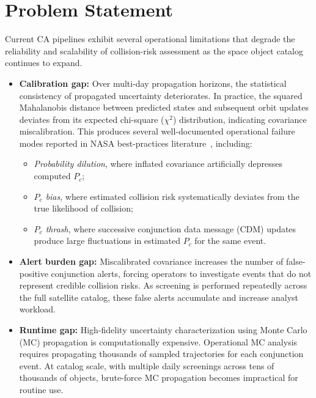 \documentclass[10pt]{article}
\begin{document}
\section{Problem Statement}\label{sec:prob_statement}

Current CA pipelines exhibit several operational limitations that degrade the reliability and scalability of collision-risk assessment as the space object catalog continues to expand.

\begin{itemize}

\item \textbf{Calibration gap:} Over multi-day propagation horizons, the statistical consistency of propagated uncertainty deteriorates. In practice, the squared Mahalanobis distance between predicted states and subsequent orbit updates deviates from its expected chi-square ($\chi^2$) distribution, indicating covariance miscalibration. This produces several well-documented operational failure modes reported in NASA best-practices literature~\cite{nasa_bestpractices, hejduk2015}, including:
\begin{itemize}
    \item \textit{Probability dilution}, where inflated covariance artificially depresses computed $P_c$;
    \item \textit{$P_c$ bias}, where estimated collision risk systematically deviates from the true likelihood of collision;
    \item \textit{$P_c$ thrash}, where successive conjunction data message (CDM) updates produce large fluctuations in estimated $P_c$ for the same event.
\end{itemize}

\item \textbf{Alert burden gap:} Miscalibrated covariance increases the number of false-positive conjunction alerts, forcing operators to investigate events that do not represent credible collision risks. As screening is performed repeatedly across the full satellite catalog, these false alerts accumulate and increase analyst workload.

\item \textbf{Runtime gap:} High-fidelity uncertainty characterization using Monte Carlo (MC) propagation is computationally expensive. Operational MC analysis requires propagating thousands of sampled trajectories for each conjunction event. At catalog scale, with multiple daily screenings across tens of thousands of objects, brute-force MC propagation becomes impractical for routine use.

\end{itemize}
\end{document}
